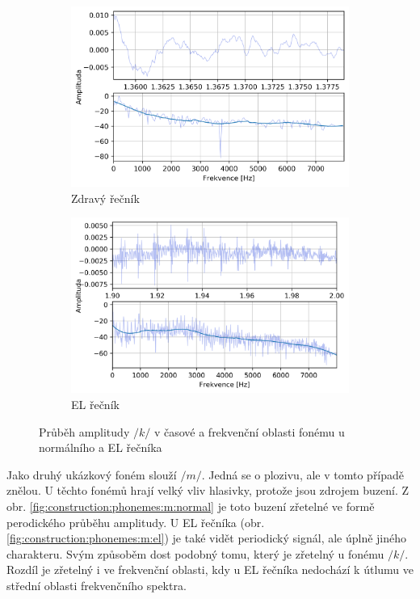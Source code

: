 \begin{figure}[htpb]
  \centering
  \begin{subfigure}[b]{0.45\textwidth}
    \includegraphics[width=\textwidth]{./ch5-construction/img/signal-normal_k.png}
    \caption{Zdravý řečník}
    \label{fig:construction:phonemes:k:normal}
  \end{subfigure}
  \begin{subfigure}[b]{0.45\textwidth}
    \includegraphics[width=\textwidth]{./ch5-construction/img/signal-el_k.png}
    \caption{EL řečník}
    \label{fig:construction:phonemes:k:el}
  \end{subfigure}
  \caption{Průběh amplitudy $/k/$ v časové a frekvenční oblasti fonému u normálního a EL řečníka}
  \label{fig:construction:phonemes:k}
\end{figure}

Jako druhý ukázkový foném slouží $/m/$. Jedná se o plozivu, ale v tomto případě znělou. U těchto fonémů hrají velký vliv hlasivky, protože jsou zdrojem buzení. Z obr. \ref{fig:construction:phonemes:m:normal} je toto buzení zřetelné ve formě perodického průběhu amplitudy. U EL řečníka (obr. \ref{fig:construction:phonemes:m:el}) je také vidět periodický signál, ale úplně jiného charakteru. Svým způsoběm dost podobný tomu, který je zřetelný u fonému $/k/$. Rozdíl je zřetelný i ve frekvenční oblasti, kdy u EL řečníka nedochází k útlumu ve střední oblasti frekvenčního spektra.

